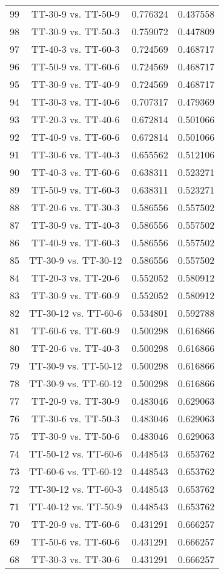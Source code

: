 \documentclass[a4paper,10pt]{article}
\begin{document}
\begin{landscape}
\begin{table}[!htp]
\begin{tabular}{cccc}
99&TT-30-9 vs. TT-50-9&0.776324&0.437558\\
98&TT-30-9 vs. TT-50-3&0.759072&0.447809\\
97&TT-40-3 vs. TT-60-3&0.724569&0.468717\\
96&TT-50-9 vs. TT-60-6&0.724569&0.468717\\
95&TT-30-9 vs. TT-40-9&0.724569&0.468717\\
94&TT-30-3 vs. TT-40-6&0.707317&0.479369\\
93&TT-20-3 vs. TT-40-6&0.672814&0.501066\\
92&TT-40-9 vs. TT-60-6&0.672814&0.501066\\
91&TT-30-6 vs. TT-40-3&0.655562&0.512106\\
90&TT-40-3 vs. TT-60-6&0.638311&0.523271\\
89&TT-50-9 vs. TT-60-3&0.638311&0.523271\\
88&TT-20-6 vs. TT-30-3&0.586556&0.557502\\
87&TT-30-9 vs. TT-40-3&0.586556&0.557502\\
86&TT-40-9 vs. TT-60-3&0.586556&0.557502\\
85&TT-30-9 vs. TT-30-12&0.586556&0.557502\\
84&TT-20-3 vs. TT-20-6&0.552052&0.580912\\
83&TT-30-9 vs. TT-60-9&0.552052&0.580912\\
82&TT-30-12 vs. TT-60-6&0.534801&0.592788\\
81&TT-60-6 vs. TT-60-9&0.500298&0.616866\\
80&TT-20-6 vs. TT-40-3&0.500298&0.616866\\
79&TT-30-9 vs. TT-50-12&0.500298&0.616866\\
78&TT-30-9 vs. TT-60-12&0.500298&0.616866\\
77&TT-20-9 vs. TT-30-9&0.483046&0.629063\\
76&TT-30-6 vs. TT-50-3&0.483046&0.629063\\
75&TT-30-9 vs. TT-50-6&0.483046&0.629063\\
74&TT-50-12 vs. TT-60-6&0.448543&0.653762\\
73&TT-60-6 vs. TT-60-12&0.448543&0.653762\\
72&TT-30-12 vs. TT-60-3&0.448543&0.653762\\
71&TT-40-12 vs. TT-50-9&0.448543&0.653762\\
70&TT-20-9 vs. TT-60-6&0.431291&0.666257\\
69&TT-50-6 vs. TT-60-6&0.431291&0.666257\\
68&TT-30-3 vs. TT-30-6&0.431291&0.666257\\

\end{tabular}
\end{table}
\end{landscape}
\end{document}

